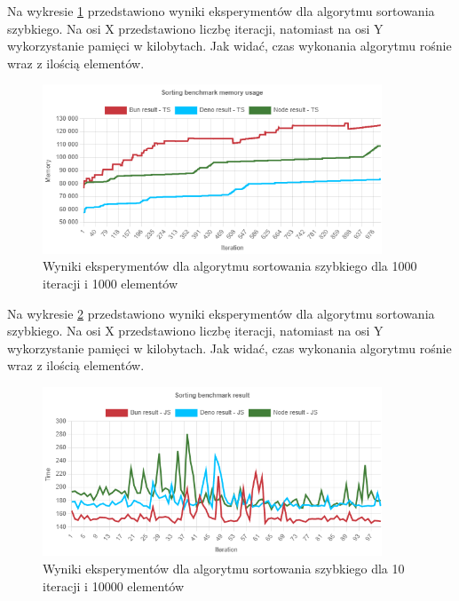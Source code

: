 Na wykresie \ref{fig:quick_sorting_e3_memory_ts} przedstawiono wyniki eksperymentów dla algorytmu sortowania szybkiego. Na osi X przedstawiono liczbę iteracji, natomiast na osi Y wykorzystanie pamięci w kilobytach. Jak widać, czas wykonania algorytmu rośnie wraz z ilością elementów.
\begin{figure}[H]
  \centering
  \includegraphics[width=0.9\textwidth]{Figures/sorting/quick/e3_memory_ts.png}
  \caption{Wyniki eksperymentów dla algorytmu sortowania szybkiego dla 1000 iteracji i 1000 elementów}
  \label{fig:quick_sorting_e3_memory_ts}
\end{figure}

Na wykresie \ref{fig:quick_sorting_e4} przedstawiono wyniki eksperymentów dla algorytmu sortowania szybkiego. Na osi X przedstawiono liczbę iteracji, natomiast na osi Y wykorzystanie pamięci w kilobytach. Jak widać, czas wykonania algorytmu rośnie wraz z ilością elementów.
\begin{figure}[H]
  \centering
  \includegraphics[width=0.9\textwidth]{Figures/sorting/quick/e4_js.png}
  \caption{Wyniki eksperymentów dla algorytmu sortowania szybkiego dla 10 iteracji i 10000 elementów}
  \label{fig:quick_sorting_e4}
\end{figure}

